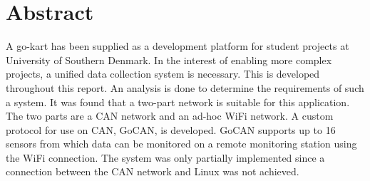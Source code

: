 \section*{Abstract}
A go-kart has been supplied as a development platform for student projects at University of Southern Denmark.
In the interest of enabling more complex projects, a unified data collection system is necessary.
This is developed throughout this report. 
An analysis is done to determine the requirements of such a system.
It was found that a two-part network is suitable for this application.
The two parts are a CAN network and an ad-hoc WiFi network.
A custom protocol for use on CAN, GoCAN, is developed.
GoCAN supports up to 16 sensors from which data can be monitored on a remote monitoring station using the WiFi connection.
The system was only partially implemented since a connection between the CAN network and Linux was not achieved.